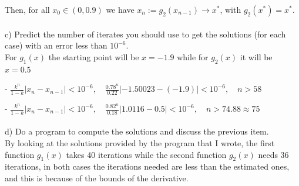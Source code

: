 \documentclass[12pt,letterpaper]{article}
\theoremstyle{definition}
\begin{document}
Then, for all $x_0 \in (0, 0.9)$ we have $x_n := g_2(x_{n-1}) \rightarrow x^*$, with $g_2(x^*)=x^*$.
\\ \\
\quad c)  Predict the number of iterates you should use to get the solutions (for each case) with an error
less than $10^{-6}$.
\\
For $g_1(x)$ the starting point will be $x=-1.9$ while for $g_2(x)$ it will be $x=0.5$

- $\frac{k^n}{1-k} |x_n - x_{n-1}| < 10^{-6}, \quad \frac{0.78^n}{0.22}|-1.50023-(-1.9)| < 10^{-6}, \quad n > 58$

- $\frac{k^n}{1-k} |x_n - x_{n-1}| < 10^{-6}, \quad \frac{0.82^n}{0.18}|1.0116-0.5| < 10^{-6}, \quad n > 74.88 \approx 75$
\\ \\
\quad d)  Do a program to compute the solutions and discuss the previous item.
\\
By looking at the solutions provided by the program that I wrote, the first function $g_1(x)$ takes 40 iterations while the second function $g_2(x)$ needs 36 iterations, in both cases the iterations needed are less than the estimated ones, and this is because of the bounds of the derivative.
\end{document}
